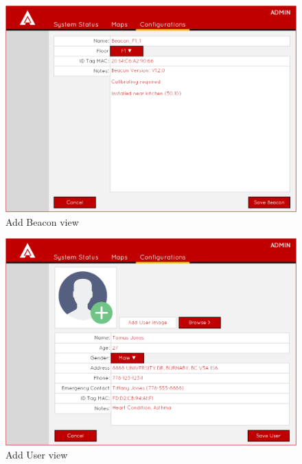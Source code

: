 \medskip
\begin{figure}[H]
\centering
    \includegraphics[scale=0.45]{./images/UIMU_add_beacon.png}
    \caption{Add Beacon view}
    \label{add_b}
\end{figure}

\medskip
\begin{figure}[H]
\centering
    \includegraphics[scale=0.45]{./images/UIMU_add_user.png}
    \caption{Add User view}
    \label{add_user}
\end{figure}





